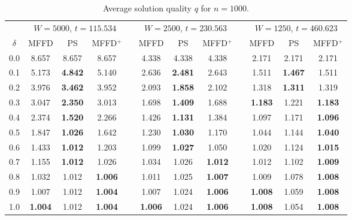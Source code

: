 \documentclass[runningheads]{llncs}
\begin{document}
\begin{table}[h!]
	\centering
	\caption{Average solution quality $q$ for $n = 1000$.}
	\begin{tabular}{c@{\hspace{15pt}}c@{\hspace{7pt}}c@{\hspace{4pt}}ccc@{\hspace{7pt}}c@{\hspace{4pt}}ccc@{\hspace{7pt}}c@{\hspace{4pt}}c}\toprule
		& \multicolumn{3}{c}{$W = 5000$, $t = 115.534$} & \phantom{a} & \multicolumn{3}{c}{$W = 2500$, $t = 230.563$} & \phantom{a} & \multicolumn{3}{c}{$W = 1250$, $t = 460.623$} \\
		\cmidrule{2-4} \cmidrule{6-8} \cmidrule{10-12}
		$\delta$ & MFFD & PS & MFFD$^+$ && MFFD & PS & MFFD$^+$ && MFFD & PS & MFFD$^+$\\ \midrule
		0.0 & 8.657 & 8.657 & 8.657 && 4.338 & 4.338 & 4.338 && 2.171 & 2.171 & 2.171 \\
		0.1 & 5.173 & \textbf{4.842} & 5.140 && 2.636 & \textbf{2.481} & 2.643 && 1.511 & \textbf{1.467} & 1.511 \\
		0.2 & 3.976 & \textbf{3.462} & 3.952 && 2.093 & \textbf{1.858} & 2.102 && 1.318 & \textbf{1.311} & 1.319 \\
		0.3 & 3.047 & \textbf{2.350} & 3.013 && 1.698 & \textbf{1.409} & 1.688 && \textbf{1.183} & 1.221 & \textbf{1.183} \\
		0.4 & 2.374 & \textbf{1.520} & 2.266 && 1.426 & \textbf{1.131} & 1.384 && 1.097 & 1.171 & \textbf{1.096} \\
		0.5 & 1.847 & \textbf{1.026} & 1.642 && 1.230 & \textbf{1.030} & 1.170 && 1.044 & 1.144 & \textbf{1.040} \\
		0.6 & 1.433 & \textbf{1.012} & 1.203 && 1.099 & \textbf{1.027} & 1.050 && 1.020 & 1.124 & \textbf{1.015} \\
		0.7 & 1.155 & \textbf{1.012} & 1.026 && 1.034 & 1.026 & \textbf{1.012} && 1.012 & 1.102 & \textbf{1.009} \\
		0.8 & 1.032 & 1.012 & \textbf{1.006} && 1.011 & 1.025 & \textbf{1.007} && 1.009 & 1.078 & \textbf{1.008} \\
		0.9 & 1.007 & 1.012 & \textbf{1.004} && 1.007 & 1.024 & \textbf{1.006} && \textbf{1.008} & 1.059 & \textbf{1.008} \\
		1.0 & \textbf{1.004} & 1.012 & \textbf{1.004} && \textbf{1.006} & 1.024 & \textbf{1.006} && \textbf{1.008} & 1.054 & \textbf{1.008} \\
		\bottomrule
	\end{tabular}
	\label{table:n=1000}	
\end{table}
\end{document}
